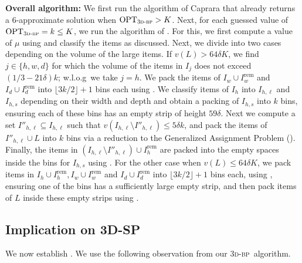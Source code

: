 \documentclass[a4paper,UKenglish,cleveref, autoref, thm-restate]{lipics-v2021}
\newcommand{\opt}{\mathrm{OPT}}
\newcommand{\tbp}{\textsc{3d-bp}\xspace}
\begin{document}
\textbf{Overall algorithm:} We first run the algorithm of Caprara \cite{caprara2008packing} that already returns a 6-approximate solution when $\opt_{\tbp} > K$. Next, for each guessed value of $\opt_{\tbp}=k \le K$, we run the algorithm of . For this, we first compute a value of $\mu$ using  and classify the items as discussed.
Next, we divide into two cases depending on the volume of the large items. If $v(L) > 64\delta K$, we find $j \in \{h,w,d\}$ for which the volume of the items in $I_j$ does not exceed $(1/3-21\delta)k$; w.l.o.g~we take $j=h$. We pack the items of $I_w \cup I^{\text{rem}}_w$ and $I_d \cup I^{\text{rem}}_d$ into $\lfloor 3k/2\rfloor +1$ bins each using . We classify items of $I_h$ into $I_{h,\ell}$ and $I_{h,s}$ depending on their width and depth and obtain a packing of $I_{h,s}$ into $k$ bins, ensuring each of these bins has an empty strip of height $59\delta$. Next we compute a set $I''_{h,\ell}\subseteq I_{h,\ell}$ such that $v(I_{h,\ell}\setminus I''_{h,\ell}) \le 5\delta k$, and pack the items of $I''_{h,\ell}\cup L$ into $k$ bins via a reduction to the Generalized Assignment Problem (). Finally, the items in $(I_{h,\ell}\setminus I''_{h,\ell})\cup I^{\text{rem}}_h$ are packed into the empty spaces inside the bins for $I_{h,s}$ using . For the other case when $v(L)\le 64\delta K$, we pack items in $I_h\cup I^{\text{rem}}_h, I_w \cup I^{\text{rem}}_w$ and $I_d \cup I^{\text{rem}}_d$ into $\lfloor 3k/2 \rfloor + 1$ bins each, using , ensuring one of the bins has a sufficiently large empty strip, and then pack items of $L$ inside these empty strips using .  









\subsection{Implication on 3D-SP}
We now establish . We use the following observation from our \tbp~algorithm.
\end{document}
